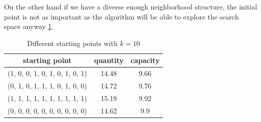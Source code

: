 On the other hand if we have a diverse enough neighborhood structure, the initial point is not as important as the algorithm will be able to explore the search space anyway \ref{tab:start}.
\begin{table}[H]
    \centering
    \begin{tabular}{c||c |c}
        starting point                 & quantity & capacity \\ \hline
        (1, 0, 0, 1, 0, 1, 0, 1, 0, 1) & 14.48    & 9.66     \\
        (0, 1, 0, 1, 1, 1, 0, 1, 0, 0) & 14.72    & 9.76     \\
        (1, 1, 1, 1, 1, 1, 1, 1, 1, 1) & 15.19    & 9.92     \\
        (0, 0, 0, 0, 0, 0, 0, 0, 0, 0) & 14.62    & 9.9      \\
    \end{tabular}
    \caption{Different starting points with $k=10$}
    \label{tab:start}
\end{table}

